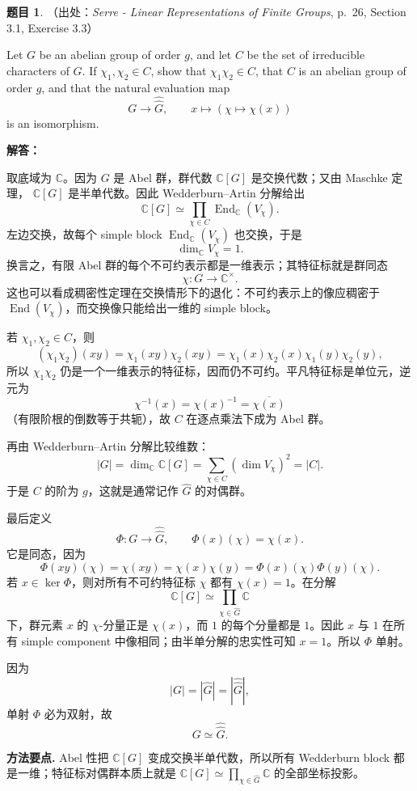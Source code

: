 \documentclass[a4paper]{ctexart}
\theoremstyle{definition}
\newtheorem{example}{题目}[section]
\theoremstyle{analysis}
\theoremstyle{plain}
\begin{document}
\begin{example}
（出处：\textit{Serre - Linear Representations of Finite Groups}, p.~26, Section 3.1, Exercise 3.3）

Let \(G\) be an abelian group of order \(g\), and let \(C\) be the set of
irreducible characters of \(G\). If \(\chi_1,\chi_2\in C\), show that
\(\chi_1\chi_2\in C\), that \(C\) is an abelian group of order \(g\), and that
the natural evaluation map
\[
  G\longrightarrow \widehat{\widehat G},
  \qquad
  x\longmapsto(\chi\mapsto \chi(x))
\]
is an isomorphism.

\textbf{解答：}

取底域为 \(\mathbb C\)。因为 \(G\) 是 Abel 群，群代数 \(\mathbb C[G]\) 是交换代数；又由 Maschke 定理，
\(\mathbb C[G]\) 是半单代数。因此 Wedderburn--Artin 分解给出
\[
  \mathbb C[G]\simeq \prod_{\chi\in C}\operatorname{End}_{\mathbb C}(V_\chi).
\]
左边交换，故每个 simple block \(\operatorname{End}_{\mathbb C}(V_\chi)\) 也交换，于是
\[
  \dim_{\mathbb C}V_\chi=1.
\]
换言之，有限 Abel 群的每个不可约表示都是一维表示；其特征标就是群同态
\[
  \chi:G\longrightarrow \mathbb C^\times.
\]
这也可以看成稠密性定理在交换情形下的退化：不可约表示上的像应稠密于
\(\operatorname{End}(V_\chi)\)，而交换像只能给出一维的 simple block。

若 \(\chi_1,\chi_2\in C\)，则
\[
  (\chi_1\chi_2)(xy)
  =
  \chi_1(xy)\chi_2(xy)
  =
  \chi_1(x)\chi_2(x)\chi_1(y)\chi_2(y),
\]
所以 \(\chi_1\chi_2\) 仍是一个一维表示的特征标，因而仍不可约。平凡特征标是单位元，逆元为
\[
  \chi^{-1}(x)=\chi(x)^{-1}=\overline{\chi(x)}
\]
（有限阶根的倒数等于共轭），故 \(C\) 在逐点乘法下成为 Abel 群。

再由 Wedderburn--Artin 分解比较维数：
\[
  |G|=\dim_{\mathbb C}\mathbb C[G]
  =
  \sum_{\chi\in C}(\dim V_\chi)^2
  =
  |C|.
\]
于是 \(C\) 的阶为 \(g\)，这就是通常记作 \(\widehat G\) 的对偶群。

最后定义
\[
  \Phi:G\longrightarrow \widehat{\widehat G},
  \qquad
  \Phi(x)(\chi)=\chi(x).
\]
它是同态，因为
\[
  \Phi(xy)(\chi)=\chi(xy)=\chi(x)\chi(y)=\Phi(x)(\chi)\Phi(y)(\chi).
\]
若 \(x\in\ker\Phi\)，则对所有不可约特征标 \(\chi\) 都有 \(\chi(x)=1\)。在分解
\[
  \mathbb C[G]\simeq \prod_{\chi\in \widehat G}\mathbb C
\]
下，群元素 \(x\) 的 \(\chi\)-分量正是 \(\chi(x)\)，而 \(1\) 的每个分量都是 \(1\)。因此 \(x\) 与 \(1\)
在所有 simple component 中像相同；由半单分解的忠实性可知 \(x=1\)。所以 \(\Phi\) 单射。

因为
\[
  |G|=|\widehat G|=|\widehat{\widehat G}|,
\]
单射 \(\Phi\) 必为双射，故
\[
  G\simeq \widehat{\widehat G}.
\]

\textbf{方法要点.}
Abel 性把 \(\mathbb C[G]\) 变成交换半单代数，所以所有 Wedderburn block 都是一维；特征标对偶群本质上就是
\(\mathbb C[G]\simeq \prod_{\chi\in\widehat G}\mathbb C\) 的全部坐标投影。
\end{example}
\end{document}
